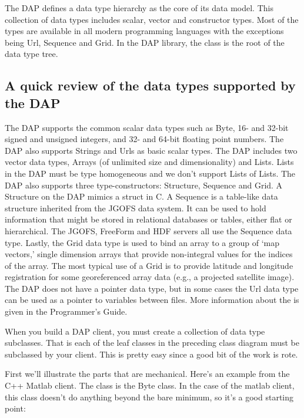 \documentclass{dods-paper}
\begin{document}
The DAP defines a data type hierarchy as the core of its data model.
This collection of data types includes scalar, vector and
constructor types. Most of the types are available in all modern
programming languages with the exceptions being Url, Sequence and
Grid. In the DAP library, the class  is the root of the
data type tree. 


\subsection{A quick review of the data types supported by the DAP}

The DAP supports the common scalar data types such as Byte, 16- and
32-bit signed and unsigned integers, and 32- and 64-bit floating point
numbers. The DAP also supports Strings and Urls as basic scalar types.
The DAP includes two vector data types, Arrays (of unlimited size and
dimensionality) and Lists. Lists in the DAP must be type homogeneous
and we don't support Lists of Lists. The DAP also supports three
type-constructors: Structure, Sequence and Grid. A Structure on the
DAP mimics a struct in C. A Sequence is a table-like data structure
inherited from the JGOFS data system. It can be used to hold
information that might be stored in relational databases or tables,
either flat or hierarchical. The JGOFS, FreeForm and HDF servers all
use the Sequence data type. Lastly, the Grid data type is used to bind
an array to a group of `map vectors,' single dimension arrays that
provide non-integral values for the indices of the array.  The most
typical use of a Grid is to provide latitude and longitude
registration for some georeferenced array data (e.g., a projected
satellite image). The DAP does not have a pointer data type, but in
some cases the Url data type can be used as a pointer to variables
between files.  More information about the 
is given in the Programmer's Guide.



When you build a DAP client, you must create a collection of data type
subclasses.  That is each of the leaf classes in the preceding class
diagram must be subclassed by your client. This is pretty easy since a
good bit of the work is rote.



First we'll illustrate the parts that are mechanical. Here's an example from
the C++ Matlab client. The class is the Byte class. In the case of the matlab
client, this class doesn't do anything beyond the bare minimum, so it's a
good starting point:
\end{document}
